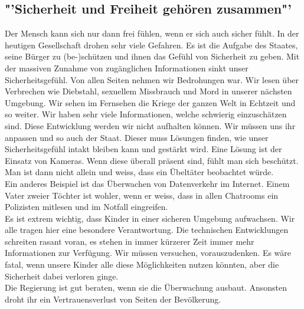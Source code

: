 \subsection*{"'Sicherheit und Freiheit gehören zusammen"'}
Der Mensch kann sich nur dann frei fühlen, wenn er sich auch sicher 
fühlt. In der heutigen Gesellschaft drohen sehr viele Gefahren. 
Es ist die Aufgabe des Staates, seine Bürger zu (be-)schützen und ihnen 
das Gefühl von Sicherheit zu geben. Mit der massiven Zunahme von 
zugänglichen Informationen sinkt unser Sicherheitsgefühl. Von allen 
Seiten nehmen wir Bedrohungen war. Wir lesen über Verbrechen wie 
Diebstahl, sexuellem Missbrauch und Mord in unserer nächsten 
Umgebung. Wir sehen im Fernsehen die Kriege der ganzen Welt in Echtzeit 
und so weiter. Wir haben sehr viele Informationen, welche schwierig 
einzuschätzen sind. Diese Entwicklung werden wir nicht aufhalten 
können. Wir müssen uns ihr anpassen und so auch der Staat. Dieser muss 
Lösungen finden, wie unser Sicherheitsgefühl intakt bleiben kann und 
gestärkt wird. Eine Lösung ist der Einsatz von 
Kameras. Wenn diese überall präsent sind, fühlt man sich beschützt. Man 
ist dann nicht allein und weiss, dass ein Übeltäter beobachtet würde.\\
Ein anderes Beispiel ist das Überwachen von Datenverkehr im Internet. 
Einem Vater zweier Töchter ist wohler, wenn er weiss, dass in 
allen Chatrooms ein Polizisten mitlesen und im Notfall 
eingreifen.\\
Es ist extrem wichtig, dass Kinder in einer sicheren Umgebung 
aufwachsen. Wir alle tragen hier eine besondere Verantwortung. Die 
technischen Entwicklungen schreiten rasant voran, es stehen in immer 
kürzerer Zeit immer mehr Informationen zur Verfügung. Wir müssen 
versuchen, vorauszudenken. Es wäre fatal, wenn unsere Kinder alle diese 
Möglichkeiten nutzen könnten, aber die Sicherheit dabei verloren ginge.\\
Die Regierung ist gut beraten, wenn sie die Überwachung 
ausbaut. Ansonsten droht ihr ein Vertrauensverlust von Seiten der 
Bevölkerung.

